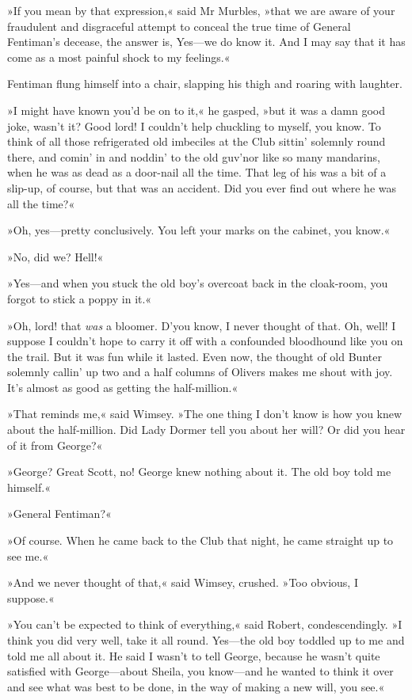 »If you mean by that expression,« said Mr Murbles, »that we are aware of your fraudulent and disgraceful attempt to conceal the true time of General Fentiman's decease, the answer is, Yes—we do know it. And I may say that it has come as a most painful shock to my feelings.«

Fentiman flung himself into a chair, slapping his thigh and roaring with laughter.

»I might have known you'd be on to it,« he gasped, »but it was a damn good joke, wasn't it? Good lord! I couldn't help chuckling to myself, you know. To think of all those refrigerated old imbeciles at the Club sittin' solemnly round there, and comin' in and noddin' to the old guv'nor like so many mandarins, when he was as dead as a door-nail all the time. That leg of his was a bit of a slip-up, of course, but that was an accident. Did you ever find out where he was all the time?«

»Oh, yes—pretty conclusively. You left your marks on the cabinet, you know.«

»No, did we? Hell!«

»Yes—and when you stuck the old boy's overcoat back in the cloak-room, you forgot to stick a poppy in it.«

»Oh, lord! that \textit{was} a bloomer. D'you know, I never thought of that. Oh, well! I suppose I couldn't hope to carry it off with a confounded bloodhound like you on the trail. But it was fun while it lasted. Even now, the thought of old Bunter solemnly callin' up two and a half columns of Olivers makes me shout with joy. It's almost as good as getting the half-million.«

»That reminds me,« said Wimsey. »The one thing I don't know is how you knew about the half-million. Did Lady Dormer tell you about her will? Or did you hear of it from George?«

»George? Great Scott, no! George knew nothing about it. The old boy told me himself.«

»General Fentiman?«

»Of course. When he came back to the Club that night, he came straight up to see me.«

»And we never thought of that,« said Wimsey, crushed. »Too obvious, I suppose.«

»You can't be expected to think of everything,« said Robert, condescendingly. »I think you did very well, take it all round. Yes—the old boy toddled up to me and told me all about it. He said I wasn't to tell George, because he wasn't quite satisfied with George—about Sheila, you know—and he wanted to think it over and see what was best to be done, in the way of making a new will, you see.«

